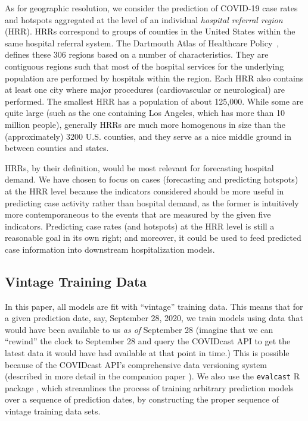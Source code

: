 \documentclass[9pt,twocolumn,twoside,lineno]{pnas-new}
\begin{document}
As for geographic resolution, we consider the prediction of COVID-19 case rates
and hotspots aggregated at the level of an individual \textit{hospital referral
  region} (HRR). HRRs correspond to groups of counties in the United States
within the same hospital referral system. The Dartmouth Atlas of Healthcare 
Policy~\cite{DartmouthHRR}, defines these 306 regions based on a number of
characteristics. They are contiguous regions such that most of the hospital
services for the underlying population are performed by hospitals within the
region. Each HRR also contains at least one city where major procedures
(cardiovascular or neurological) are performed. The smallest HRR has a
population of about 125,000. While some are quite large (such as the one
containing Los Angeles, which has more than 10 million people), generally HRRs  
are much more homogenous in size than the (approximately) 3200 U.S. counties,   
and they serve as a nice middle ground in between counties and states.  

HRRs, by their definition, would be most relevant for forecasting hospital
demand.  We have chosen to focus on cases (forecasting and predicting
hotspots) at the HRR level because the indicators considered should be more 
useful in predicting case activity rather than hospital demand, as the former is  
intuitively more contemporaneous to the events that are measured by
the given five indicators. Predicting case rates (and hotspots) at the HRR level
is still a reasonable goal in its own right; and moreover, it could be used to
feed predicted case information into downstream hospitalization models.

\subsection{Vintage Training Data}

In this paper, all models are fit with ``vintage'' training data. This means
that for a given prediction date, say, September 28, 2020, we train models 
using data that would have been available to us \textit{as of}
September 28 (imagine that we can ``rewind'' the clock to September 28 and query
the COVIDcast API to get the latest data it would have had available at that
point in time.)  This is possible because of the COVIDcast API's comprehensive
data versioning system (described in more detail in the companion paper
\cite{Reinhart:2021}).  We also use the \texttt{evalcast} R package
\cite{EvalcastR}, which streamlines the process of training arbitrary
prediction models over a sequence of prediction dates, by constructing the
proper sequence of vintage training data sets.    
\end{document}
